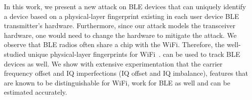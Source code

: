 
In this work, we present a new attack on BLE devices that can uniquely
identify a device based on a physical-layer fingerprint existing in each user device 
BLE transmitter's hardware. 
%
%
%
%
Furthermore, since our attack models the transceiver hardware, one would need to change the hardware to mitigate the 
attack. 
%
%
%
%
We observe that BLE radios often share a chip with the WiFi. Therefore, the well-studied unique physical-layer fingerprints for WiFi~\cite{
vohuuusrp,
Brik_radiometric,
deviceID_kose}.
can be used to track BLE devices as well. We show with extensive experimentation that the carrier frequency 
 offset and IQ imperfections (IQ offset and IQ imbalance), features that are 
 known to be distinguishable for WiFi, work for BLE as well and can be estimated accurately. 

